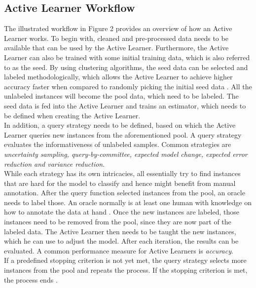 \documentclass[11pt, a4paper]{article}
\begin{document}
\subsection{Active Learner Workflow} \label{subs:activelearnerworkflow}
The illustrated workflow in Figure 2 provides an overview of how an Active Learner works. 
To begin with, cleaned and pre-processed data needs to be available that can be used by the Active Learner. 
Furthermore, the Active Learner can also be trained with some initial training data, which is also referred to as the seed. 
By using clustering algorithms, the seed data can be selected and labeled methodologically, which allows the Active Learner to achieve 
higher accuracy faster when compared to randomly picking the initial seed data \citep{kang2004usingclusterbasedsampling}. All the unlabeled 
instances will become the pool data, which need to be labeled. The seed data is fed into the Active Learner and trains an estimator, 
which needs to be defined when creating the Active Learner.\\
In addition, a query strategy needs to be defined, based on which the Active Learner queries new instances from the aforementioned pool. 
A query strategy evaluates the informativeness of unlabeled samples. Common strategies are \emph{uncertainty sampling, query-by-committee, 
expected model change, expected error reduction and variance reduction}. \\
While each strategy has its own intricacies, all essentially try to find instances that are hard for the model to classify and hence might benefit from manual annotation. 
After the query function selected instances from the pool, an oracle needs to label those. An oracle normally is at 
least one human with knowledge on how to annotate the data at hand \citep{settles2009activeLL}. Once the new instances are labeled, 
those instances need to be removed from the pool, since they are now part of the labeled data. The Active Learner then needs 
to be taught the new instances, which he can use to adjust the model. After each iteration, the results can be evaluated. 
A common performance measure for Active Learners is \emph{accuracy}.\\
If a predefined stopping criterion is not yet met, the query strategy selects more instances from the pool and repeats the process.
If the stopping criterion is met, the process ends \citep{lu2019investigating}.
\end{document}
